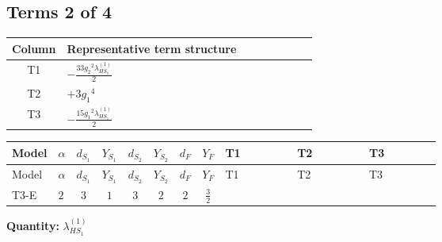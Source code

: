 \documentclass[8pt]{article}
\begin{document}
\begin{landscape}
\subsection*{Terms 2 of 4}
\begin{center}
\begin{tabular}{@{}c >{\raggedright\arraybackslash}p{0.82\linewidth}@{}}
\toprule
Column & Representative term structure \\
\midrule
T1 & \(\displaystyle -\frac{33 {g_2}^2 {\lambda_{HS_1}^{(1)}}}{2}\) \\
\midrule
T2 & \(\displaystyle +3 {g_1}^4\) \\
\midrule
T3 & \(\displaystyle -\frac{15 {g_1}^2 {\lambda_{HS_1}^{(1)}}}{2}\) \\
\midrule
\bottomrule
\end{tabular}
\end{center}
\smallskip
\tiny
\begin{longtable}{@{}llcccccc >{\raggedright\arraybackslash}p{0.21\linewidth} >{\raggedright\arraybackslash}p{0.21\linewidth} >{\raggedright\arraybackslash}p{0.21\linewidth}@{}}
\toprule
Model & $\alpha$ & $d_{S_1}$ & $Y_{S_1}$ & $d_{S_2}$ & $Y_{S_2}$ & $d_F$ & $Y_F$ & T1 & T2 & T3 \\
\midrule
\endfirsthead
\toprule
Model & $\alpha$ & $d_{S_1}$ & $Y_{S_1}$ & $d_{S_2}$ & $Y_{S_2}$ & $d_F$ & $Y_F$ & T1 & T2 & T3 \\
\midrule
\endhead
T3-E & $2$ & $3$ & $1$ & $3$ & $2$ & $2$ & $\frac{3}{2}$ & \scriptsize\adjustbox{max width=\linewidth}{$\begin{gathered} -\frac{33 {g_2}^2 {\lambda_{HS_1}^{(1)}}}{2}\end{gathered}$} & \scriptsize\adjustbox{max width=\linewidth}{$\begin{gathered} +3 {g_1}^4\end{gathered}$} & \scriptsize\adjustbox{max width=\linewidth}{$\begin{gathered} -\frac{15 {g_1}^2 {\lambda_{HS_1}^{(1)}}}{2}\end{gathered}$} \\
\midrule
\bottomrule
\end{longtable}
\clearpage
\noindent\textbf{Quantity: }$\lambda_{HS_1}^{(1)}$\par\smallskip

\end{landscape}
\end{document}
